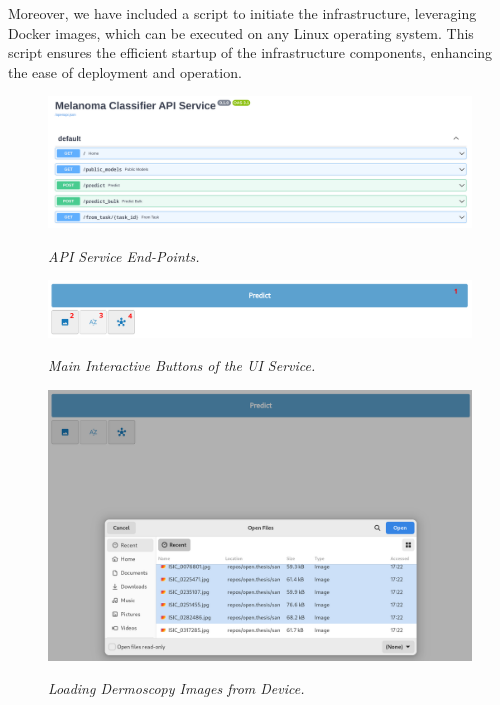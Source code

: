 Moreover, we have included a script to initiate the infrastructure, leveraging
Docker images, which can be executed on any Linux operating system. This script
ensures the efficient startup of the infrastructure components, enhancing the
ease of deployment and operation.

\begin{figure}[H]
  \centering
  \begin{adjustbox}{width=\textwidth, trim={0.2cm 0cm 0.1cm 0cm}, clip}
    \includegraphics[width=\textwidth]{imatges/results/api-endpoints.png}
  \end{adjustbox}
  \caption[API Service End-Points]{\textit{API Service End-Points. }}
  {\label{fig:api-endpoints}}
\end{figure}

\begin{figure}[H]
  \centering
  \includegraphics[width=\textwidth]{imatges/results/ui-tools.png}
  \caption[Main Interactive Buttons of the UI Service]{\textit{Main Interactive Buttons of the UI Service. }}
  {\label{fig:ui-tools}}
\end{figure}

\begin{figure}[H]
  \centering
  \begin{adjustbox}{width=\textwidth, trim={0.05cm 1.25cm 0cm 0.1cm}, clip}
    \includegraphics[width=\textwidth]{imatges/results/selecting-images.png}
  \end{adjustbox}
  \caption[Loading Dermoscopy Images from Device]{\textit{Loading Dermoscopy Images from Device. }}
  {\label{fig:selecting-imgs}}
\end{figure}

